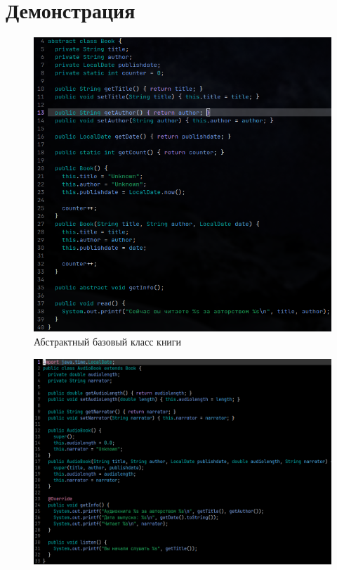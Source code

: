 \documentclass[a4paper, 17pt]{extarticle}
\begin{document}
\pagebreak

\section{Демонстрация}

\begin{figure}[h!]
  \includegraphics[width=.8\textwidth]{book.png}
  \caption{Абстрактный базовый класс книги}
\end{figure}

\pagebreak

\begin{figure}[h!]
  \includegraphics[width=\textwidth]{audiobook.png}
  \caption{}
\end{figure}
\end{document}
